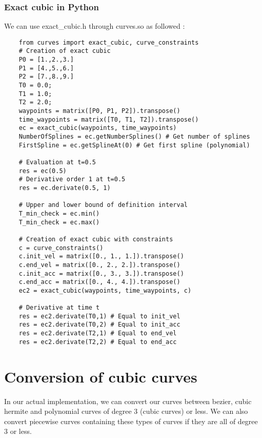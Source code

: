 \documentclass{article}
\begin{document}
    \subsubsection{Exact cubic in Python}

    We can use exact\_cubic.h through curves.so as followed :
    \begin{lstlisting}
    from curves import exact_cubic, curve_constraints
    # Creation of exact cubic
    P0 = [1.,2.,3.]
    P1 = [4.,5.,6.]
    P2 = [7.,8.,9.]
    T0 = 0.0;
    T1 = 1.0;
    T2 = 2.0;
    waypoints = matrix([P0, P1, P2]).transpose()
    time_waypoints = matrix([T0, T1, T2]).transpose()
    ec = exact_cubic(waypoints, time_waypoints)
    NumberOfSplines = ec.getNumberSplines() # Get number of splines
    FirstSpline = ec.getSplineAt(0) # Get first spline (polynomial)

    # Evaluation at t=0.5
    res = ec(0.5)
    # Derivative order 1 at t=0.5
    res = ec.derivate(0.5, 1)

    # Upper and lower bound of definition interval
    T_min_check = ec.min()
    T_min_check = ec.max()

    # Creation of exact cubic with constraints
    c = curve_constraints()
    c.init_vel = matrix([0., 1., 1.]).transpose()
    c.end_vel = matrix([0., 2., 2.]).transpose()
    c.init_acc = matrix([0., 3., 3.]).transpose()
    c.end_acc = matrix([0., 4., 4.]).transpose()
    ec2 = exact_cubic(waypoints, time_waypoints, c)

    # Derivative at time t
    res = ec2.derivate(T0,1) # Equal to init_vel
    res = ec2.derivate(T0,2) # Equal to init_acc
    res = ec2.derivate(T2,1) # Equal to end_vel
    res = ec2.derivate(T2,2) # Equal to end_acc
    \end{lstlisting}

\section{Conversion of cubic curves}

In our actual implementation, we can convert our curves between bezier, cubic hermite and polynomial curves of degree 3 (cubic curves) or less. We can also convert piecewise curves containing these types of curves if they are all of degree 3 or less.
\end{document}
